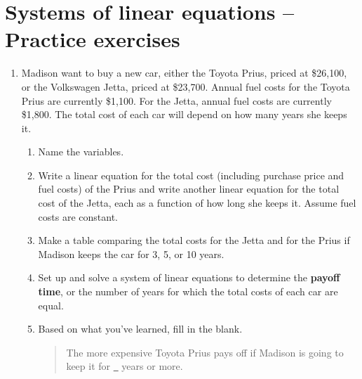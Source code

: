 \section{Systems of linear equations -- Practice exercises}

\begin{enumerate}
\item Madison want to buy a new car, either the Toyota Prius, priced at \$26,100, or the Volkswagen Jetta, priced at \$23,700.  Annual fuel costs for the Toyota Prius are currently \$1,100.  For the Jetta, annual fuel costs are currently \$1,800.  The total cost of each car will depend on how many years she keeps it. 
\begin{enumerate}
\item Name the variables. \vfill
\item Write a linear equation for the total cost (including purchase price and fuel costs) of the Prius and write another linear equation for the total cost of the Jetta, each as a function of how long she keeps it.  Assume fuel costs are constant. \vfill
\item Make a table comparing the total costs for the Jetta and for the Prius if Madison keeps the car for 3, 5, or 10 years. \vfill
\item Set up and solve a system of linear equations to determine the \textbf{payoff time}, or the number of years for which the total costs of each car are equal. \vfill \vfill
\item Based on what you've learned, fill in the blank.
\begin{quote}
The more expensive Toyota Prius pays off if Madison is going to keep it for \underline{\quad~} years or more.  
\end{quote}
\end{enumerate}

\newpage %


\end{enumerate}
